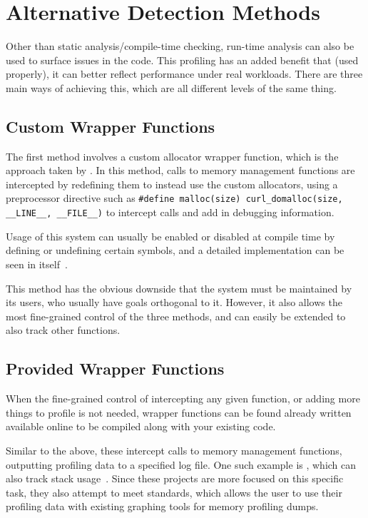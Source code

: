 \section{Alternative Detection Methods}

Other than static analysis/compile-time checking, run-time analysis can also be used to surface issues in the code. This profiling has an added benefit that (used properly), it can better reflect performance under real workloads. There are three main ways of achieving this, which are all different levels of the same thing.

\subsection{Custom Wrapper Functions}

The first method involves a custom allocator wrapper function, which is the approach taken by . In this method, calls to memory management functions are intercepted by redefining them to instead use the custom allocators, using a preprocessor directive such as \texttt{\#define malloc(size) curl\_domalloc(size, \_\_LINE\_\_, \_\_FILE\_\_)} to intercept calls and add in debugging information.

Usage of this system can usually be enabled or disabled at compile time by defining or undefining certain symbols, and a detailed implementation can be seen in  itself~\cite{curlallocator}.

This method has the obvious downside that the system must be maintained by its users, who usually have goals orthogonal to it. However, it also allows the most fine-grained control of the three methods, and can easily be extended to also track other functions.

\subsection{Provided Wrapper Functions}

When the fine-grained control of intercepting any given function, or adding more things to profile is not needed, wrapper functions can be found already written available online to be compiled along with your existing code.

Similar to the above, these intercept calls to memory management functions, outputting profiling data to a specified log file. One such example is , which can also track stack usage~\cite{malloccount}. Since these projects are more focused on this specific task, they also attempt to meet standards, which allows the user to use their profiling data with existing graphing tools for memory profiling dumps.

